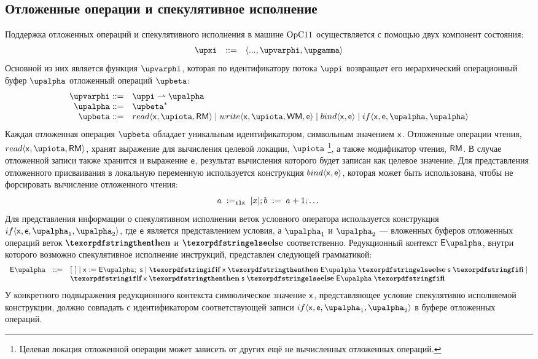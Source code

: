 \subsection{Отложенные операции и спекулятивное исполнение}
\label{sec:opc11:formal:spec}

Поддержка отложенных операций и спекулятивного исполнения в машине $\mathrm{OpC11}$ осуществляется
с помощью двух компонент состояния:
\[\begin{array}{r c l}
\auxX             & ::=        & \angled{..., \stPhi, \stGamma} \\
\end{array}\]
Основной из них является функция $\stPhi$, которая по идентификатору потока $\stpath$ возвращает его иерархический
операционный буфер $\stAlpha$ отложенный операций $\stPostOp$:
\[\begin{array}{r l}
    \stPhi    ::= & \stpath \prarrow \stAlpha \\
    \stAlpha  ::= & \stPostOp^{*} \\
    \stPostOp ::= & read\angled{\vName,\locVar,\RM} \mid
                    write\angled{\vName,\locVar,\WM,\Expr} \mid
                    bind\angled{\vName,\Expr} \mid
                    if\angled{\vName,\Expr,\stAlpha,\stAlpha}\\
\end{array}\]
Каждая отложенная операция $\stPostOp$ обладает уникальным идентификатором, символьным значением $\mathsf{x}$.
Отложенные операции чтения, $read\angled{\vName,\locVar,\RM}$, хранят выражение для вычисления целевой локации, $\locvar$%
\footnote{Целевая локация отложенной операции может зависеть от других ещё не вычисленных отложенных операций.},
а также модификатор чтения, $\mathsf{RM}$.
В случае отложенной записи также хранится и выражение $\mathsf{e}$, результат вычисления которого будет записан как целевое значение.
Для представления отложенного присваивания в локальную переменную используется конструкция $bind\langle \mathsf{x}, \mathsf{e} \rangle$, которая
может быть использована, чтобы не форсировать вычисление отложенного чтения:
\[
a \;:=_{\mathtt{rlx}}\;[x]; b\;:=\;a + 1; \dots
\]
Для представления информации о спекулятивном исполнении веток условного оператора используется конструкция
$if\angled{\vName,\Expr,\stAlpha_1,\stAlpha_2}$,
где $\mathsf{e}$ является представлением условия, а $\stAlpha_1$ и $\stAlpha_2$ --- вложенных буферов отложенных операций
веток $\kw{then}$ и $\kw{else}$ соответственно.
Редукционный контекст $\EvalSpecContext$, внутри которого возможно спекулятивное исполнение инструкций, представлен
следующей грамматикой:
\[\begin{array}{rcl}
\EvalSpecContext & ::= & \hole \mid
                         \Bind{\vName}{\EvalSpecContext}{\AST} \mid
    \IfThenElse{\vName}{\EvalSpecContext}{\AST}\mid \\
&& \IfThenElse{\vName}{\AST}{\EvalSpecContext}
\end{array}\]
У конкретного подвыражения редукционного контекста символическое значение $\mathsf{x}$, представляющее условие спекулятивно
исполняемой конструкции, должно совпадать с идентификатором соответствующей записи $if\angled{\vName,\Expr,\stAlpha_1,\stAlpha_2}$
в буфере отложенных операций.

